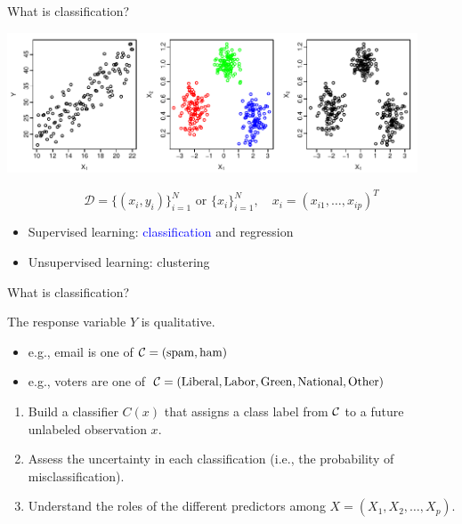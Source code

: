 \documentclass[14pt]{beamer}
\begin{document}
\begin{frame}{What is classification?}\large


\centerline{\includegraphics[width=12.2cm]{statlearn.pdf}}
\vspace{-1cm}
$$ \mathcal{D} = \{(x_i, y_i)\}_{i = 1}^N \text{~or~} \{x_i\}_{i = 1}^N, \quad x_i = (x_{i1}, \dots, x_{ip})^{T}$$


\begin{itemize}\normalsize
	\item Supervised learning: \textcolor{blue}{classification} and regression
	\item Unsupervised learning: clustering
\end{itemize}

\end{frame}

\begin{frame}{What is classification?}

The response variable $Y$ is \alert{qualitative}.
\begin{itemize}
\item e.g., email is one of ${\cal C} = (\text{spam},\text{ham})$
\item e.g., voters are one of ${\cal C} = (\text{Liberal},\text{Labor},\text{Green},\text{National},\text{Other})$
\end{itemize}
\begin{enumerate}
\item Build a classifier $C(x)$ that assigns a class label from ${\cal C}$ to a future unlabeled observation $x$.
\item Assess the uncertainty in each classification (i.e., the probability of misclassification).
\item Understand the roles of the different predictors among $X = (X_1,X_2,\dots,X_p)$.
\end{enumerate}
\end{frame}
\end{document}
